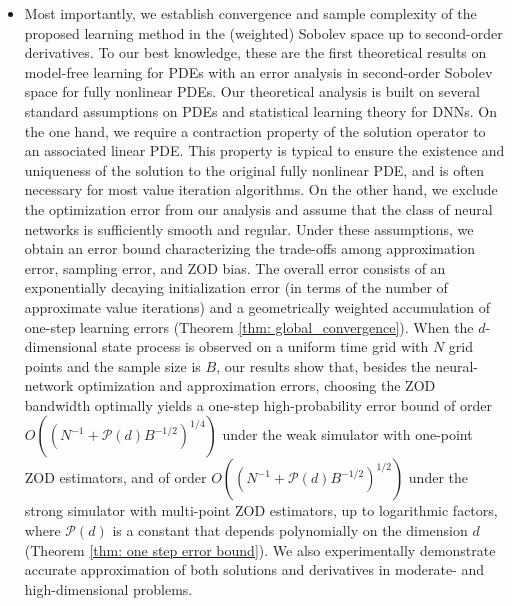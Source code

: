 \documentclass[twoside,11pt]{article}
\newcommand{\1}{\mathbf{1}}
\numberwithin{equation}{section}
\begin{document}
\begin{itemize}
\item Most importantly, we establish convergence and sample complexity of the proposed learning method in the (weighted) Sobolev space up to second-order derivatives. To our best knowledge, these are the first theoretical results on model-free learning for PDEs with an error analysis in second-order Sobolev space for fully nonlinear PDEs. Our theoretical analysis is built on several standard assumptions on PDEs and statistical learning theory for DNNs. On the one hand, we require a contraction property of the solution operator to an associated linear PDE. This property is typical to ensure the existence and uniqueness of the solution to the original fully nonlinear PDE, and is often necessary for most value iteration algorithms. On the other hand, we exclude the optimization error from our analysis and assume that the class of neural networks is sufficiently smooth and regular. Under these assumptions, we obtain an error bound characterizing the trade-offs among approximation error, sampling error, and ZOD bias. The overall error consists of an exponentially decaying initialization error (in terms of the number of approximate value iterations) and a geometrically weighted accumulation of one-step learning errors (Theorem \ref{thm: global_convergence}). When the $d$-dimensional state process is observed on a uniform time grid with $N$ grid points and the sample size is $B$, our results show that, besides the neural-network optimization and approximation errors, choosing the ZOD bandwidth optimally yields a one-step high-probability error bound of order $O((N^{-1}+\mathcal P(d)B^{-1/2})^{1/4})$ under the weak simulator with one-point ZOD estimators, and of order $O((N^{-1}+\mathcal P(d)B^{-1/2})^{1/2})$ under the strong simulator with multi-point ZOD estimators, up to logarithmic factors, where $\mathcal{P}(d)$ is a constant that depends polynomially on the dimension $d$ (Theorem \ref{thm: one step error bound}). We also experimentally demonstrate accurate approximation of both solutions and derivatives in moderate- and high-dimensional problems.
\end{itemize}
\end{document}
